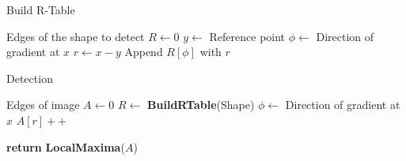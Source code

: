 \documentclass[12pt]{article}
\begin{document}
\begin{algorithm}
\caption{Build R-Table}
\begin{algorithmic}

\REQUIRE Edges of the shape to detect
\STATE $R \leftarrow 0$ 
\STATE $y \leftarrow$ Reference point
    \STATE $\phi \leftarrow$ Direction of gradient at $x$
    \STATE $r \leftarrow x - y$
    \STATE Append $R[\phi]$ with $r$
\ENDFOR

\end{algorithmic}
\end{algorithm}

\begin{algorithm}
\caption{Detection}
\begin{algorithmic}

\REQUIRE Edges of image
\STATE $A \leftarrow 0$ 
\STATE $R \leftarrow $ \textbf{BuildRTable}(Shape) 
    \STATE $\phi \leftarrow$ Direction of gradient at $x$
        \STATE $A[r] ++$
    \ENDFOR
\ENDFOR

\STATE \textbf{return} \textbf{LocalMaxima}($A$)

\end{algorithmic}
\end{algorithm}
\end{document}
